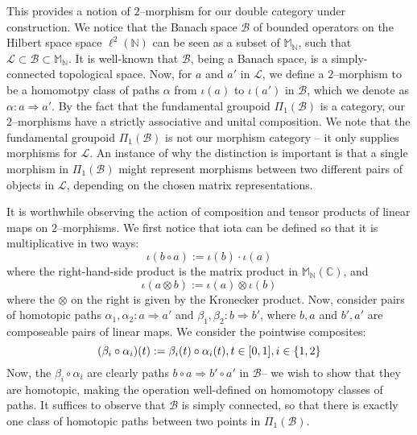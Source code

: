 \documentclass{amsart}
\newcommand{\M}{\mathbb{M}}
\newcommand{\N}{\mathbb{N}}
\newcommand{\C}{\mathbb{C}}
\newcommand{\s}{\mathscr}
\newcommand{\tensor}{\otimes}
\newcommand{\To}[1][]{\stackrel{#1}{\Longrightarrow}}
\newcommand{\curly}[1]{\left\{ #1 \right\}}
\newcommand{\set}[2][]{\ifthenelse{\equal{#1}{}}
                                  {\curly{#2}}
                                  {\curly{#1\ \textbf{:}\ #2}}}
\numberwithin{thm}{section}
\theoremstyle{definition}
\begin{document}
This provides a notion of $2$--morphism for our double category under
construction. We notice that the Banach space $\s{B}$ of bounded operators on
the Hilbert space space $\ell^2(\N)$ can be seen as a subset of $\M_{\N}$, such
that $\s{L} \subset \s{B} \subset \M_{\N}$. It is well-known that $\s{B}$, being
a Banach space, is a simply-connected topological space. Now, for $a$ and $a'$
in $\s{L}$, we define a $2$--morphism to be a homomotpy class of paths $\alpha$
from $\iota(a)$ to $\iota(a')$ in $\s{B}$, which we denote as
$\alpha : a \To a'$. By the fact that the fundamental groupoid
$\Pi_1(\s{B})$ is a category, our $2$--morphisms have a strictly associative and
unital composition.  We note that the fundamental groupoid $\Pi_1(\s{B})$ is not
our morphism category -- it only supplies morphisms for $\s{L}$. An instance of
why the distinction is important is that a single morphism in $\Pi_1(\s{B})$
might represent morphisms between two different pairs of objects in $\s{L}$,
depending on the chosen matrix representations.

It is worthwhile observing the action of composition and tensor products of
linear maps on $2$--morphisms. We first notice that iota can be defined so that
it is multiplicative in two ways:
\[
  \iota(b \circ a) := \iota(b) \cdot \iota(a)
\]
where the right-hand-side product is the matrix product in $\M_{\N}(\C)$, and
\[
  \iota(a \tensor b) := \iota(a) \tensor \iota(b)
\]
where the $\tensor$ on the right is given by the Kronecker product. Now,
consider pairs of homotopic paths
$\alpha_1, \alpha_2 : a \To a'$ and
$\beta_1, \beta_2 : b \To b'$, where $b, a$ and $b', a'$ are
composeable pairs of linear maps. We consider the pointwise composites:
\begin{equation}\label{eqn:pointwise_comp}
  (\beta_i \circ \alpha_i)(t) := \beta_i(t) \circ \alpha_i(t), t \in [0, 1],
    i \in \set{1, 2}
\end{equation}
Now, the $\beta_i \circ \alpha_i$ are clearly paths
$b \circ a \To b' \circ a'$ in $\s{B}$-- we wish to show that
they are homotopic, making the operation well-defined on homomotopy classes of
paths. It suffices to observe that $\s{B}$ is simply connected, so that there is
exactly one class of homotopic paths between two points in $\Pi_1(\s{B})$.
\end{document}
